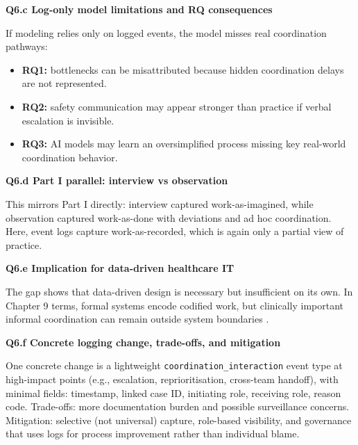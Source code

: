 \begin{enumerate}
\textbf{Q6.c Log-only model limitations and RQ consequences}\par
If modeling relies only on logged events, the model misses real coordination pathways:
\begin{itemize}
  \item \textbf{RQ1:} bottlenecks can be misattributed because hidden coordination delays are not represented.
  \item \textbf{RQ2:} safety communication may appear stronger than practice if verbal escalation is invisible.
  \item \textbf{RQ3:} AI models may learn an oversimplified process missing key real-world coordination behavior.
\end{itemize}

\textbf{Q6.d Part I parallel: interview vs observation}\par
This mirrors Part I directly: interview captured work-as-imagined, while observation captured work-as-done with deviations and ad hoc coordination. Here, event logs capture work-as-recorded, which is again only a partial view of practice.

\textbf{Q6.e Implication for data-driven healthcare IT}\par
The gap shows that data-driven design is necessary but insufficient on its own. In Chapter 9 terms, formal systems encode codified work, but clinically important informal coordination can remain outside system boundaries .

\textbf{Q6.f Concrete logging change, trade-offs, and mitigation}\par
One concrete change is a lightweight \texttt{coordination\_interaction} event type at high-impact points (e.g., escalation, reprioritisation, cross-team handoff), with minimal fields: timestamp, linked case ID, initiating role, receiving role, reason code. Trade-offs: more documentation burden and possible surveillance concerns. Mitigation: selective (not universal) capture, role-based visibility, and governance that uses logs for process improvement rather than individual blame.
\end{enumerate}
